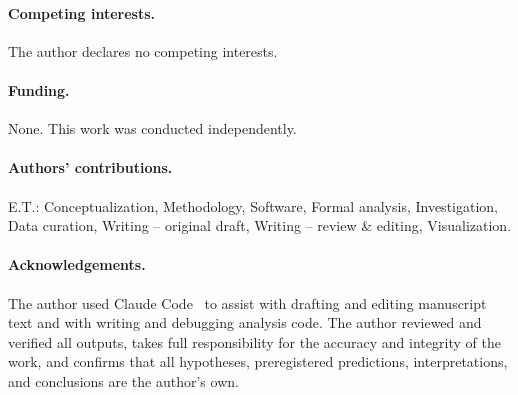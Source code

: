 \documentclass[11pt]{article}
\begin{document}
\paragraph{Competing interests.}
The author declares no competing interests.

\paragraph{Funding.}
None. This work was conducted independently.

\paragraph{Authors' contributions.}
E.T.: Conceptualization, Methodology, Software, Formal analysis,
Investigation, Data curation, Writing -- original draft, Writing --
review \& editing, Visualization.

\paragraph{Acknowledgements.}
The author used Claude Code~\citep{claudecode} to assist with drafting
and editing manuscript text and with writing and debugging analysis code.
The author reviewed and verified all outputs, takes full responsibility
for the accuracy and integrity of the work, and confirms that all
hypotheses, preregistered predictions, interpretations, and conclusions
are the author's own.
\end{document}
